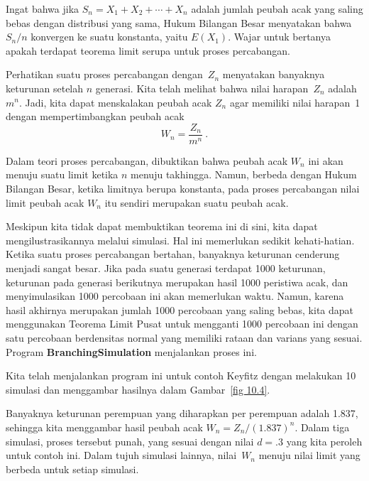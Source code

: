 \begin{example}
Ingat bahwa jika $S_n = X_1 + X_2 +\cdots+ X_n$ adalah jumlah peubah acak yang saling
bebas dengan distribusi yang sama, Hukum Bilangan Besar menyatakan bahwa
$S_n/n$ konvergen ke suatu konstanta, yaitu $E(X_1)$.  Wajar untuk bertanya apakah
terdapat teorema limit serupa untuk proses percabangan.

Perhatikan suatu proses percabangan dengan~$Z_n$ menyatakan banyaknya keturunan
setelah $n$ generasi.  Kita telah melihat bahwa nilai harapan~$Z_n$
adalah~$m^n$.  Jadi, kita dapat menskalakan peubah acak $Z_n$ agar memiliki nilai harapan~1
dengan mempertimbangkan peubah acak
$$
W_n = \frac{Z_n}{m^n}\ .
$$

Dalam teori proses percabangan, dibuktikan bahwa peubah acak
$W_n$ ini akan menuju suatu limit ketika $n$ menuju takhingga.  Namun, berbeda dengan
Hukum Bilangan Besar, ketika limitnya berupa konstanta, pada proses percabangan
nilai limit peubah acak $W_n$ itu sendiri merupakan suatu peubah
acak.

Meskipun kita tidak dapat membuktikan teorema ini di sini, kita dapat mengilustrasikannya melalui simulasi. 
Hal ini memerlukan sedikit kehati-hatian.  Ketika suatu proses percabangan bertahan, banyaknya
keturunan cenderung menjadi sangat besar.  Jika pada suatu generasi terdapat 1000
keturunan, keturunan pada generasi berikutnya merupakan hasil 1000 peristiwa
acak, dan menyimulasikan 1000 percobaan ini akan memerlukan waktu.  Namun,
karena hasil akhirnya merupakan jumlah 1000 percobaan yang saling bebas, kita dapat menggunakan
Teorema Limit Pusat untuk mengganti 1000 percobaan ini dengan satu
percobaan berdensitas normal yang memiliki rataan dan varians yang sesuai.  Program
{\bf BranchingSimulation} menjalankan proses ini.
\par
Kita telah menjalankan program ini untuk contoh Keyfitz dengan melakukan 10 simulasi
dan menggambar hasilnya dalam Gambar~\ref{fig 10.4}.



Banyaknya keturunan perempuan yang diharapkan per perempuan adalah 1.837, sehingga kita
menggambar hasil peubah acak $W_n = Z_n/(1.837)^n$.  Dalam tiga
simulasi, proses tersebut punah, yang sesuai dengan nilai $d
= .3$ yang kita peroleh untuk contoh ini.  Dalam tujuh simulasi lainnya,
nilai~$W_n$ menuju nilai limit yang berbeda untuk setiap simulasi.
\end{example}

